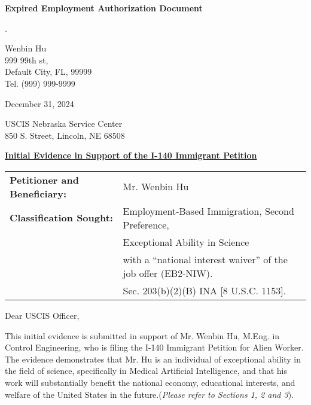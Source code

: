 \documentclass{article}
\begin{document}
% 

\vspace*{\fill}
\begin{center}

{\LARGE \bf
Expired Employment Authorization Document
}

\end{center}
\vspace*{\fill}

.

% 



\begin{flushright}
Wenbin Hu\\
999 99th st,\\
Default City, FL, 99999\\
Tel. (999) 999-9999
\end{flushright}

December 31, 2024

\label{IE}

USCIS Nebraska Service Center\\
850 S. Street, Lincoln, NE 68508

\underline{\bf Initial Evidence in Support of the I-140 Immigrant Petition}

\begin{tabular}{ll}
{\bf Petitioner and Beneficiary:} & Mr. Wenbin Hu \\
{\bf Classification Sought:} & Employment-Based Immigration, Second Preference, \\
& Exceptional Ability in Science \\
& with a “national interest waiver” of the job offer (EB2-NIW).\\
& Sec. 203(b)(2)(B) INA [8 U.S.C. 1153].
\end{tabular}
\vspace{2\baselineskip}

Dear USCIS Officer,

This initial evidence is submitted in support of Mr. Wenbin Hu, M.Eng. in Control Engineering, who is filing the I-140 Immigrant Petition for Alien Worker. The evidence demonstrates that Mr. Hu is an individual of exceptional ability in the field of science, specifically in Medical Artificial Intelligence, and that his work will substantially benefit the national economy, educational interests, and welfare of the United States in the future.({\it Please refer to Sections 1, 2 and 3}).
\end{document}
